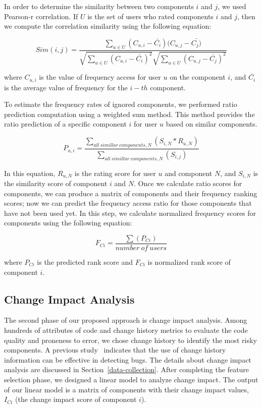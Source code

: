 In order to determine the similarity between two components $i$ and $j$, we used
Pearson-r correlation.
If $U$ is the set of users who rated components $i$ and $j$, then we compute
the correlation similarity using the following equation:

\[
{Sim (i,j) = \frac {\sum_{u\in {U}}(C_{u,i} - \bar{C_i})(C_{u,j} - \bar{C_j)}}
	{ \sqrt{\sum_{u\in {U}}({C_{u,i} - \bar{C_i}})^{2}}
		{ \sqrt{\sum_{u\in {U}}({C_{u,j} - \bar{C_j}})^{2}}}}}	
\]

where $C_{u,i}$ is the value of frequency access for user $u$ on the component $i$, and
$\bar{C_i}$ is the average value of frequency for the $i-th$ component. 

To estimate the frequency rates of ignored components, we performed
ratio prediction computation using a weighted sum method.
This method provides the ratio prediction of a specific component $i$
for user $u$ based on similar components. 

\[
{P_{u,i} = \frac {\sum_{{all\: simillar\: components , N}}(S_{i,N} * R_{u,N})}
	{\sum_{{all\: simillar\: components, N}}({S_{i,j}})}}
\]

In this equation, $R_{u,N}$ is the rating score for user $u$ and component $N$, 
and $S_{i,N}$ is the similarity score of component $i$ and $N$.
Once we calculate ratio scores for components, we can produce a matrix of components
and their frequency ranking scores;  
now we can predict the frequency access ratio for 
those components that have not been used yet.
In this step, we calculate normalized frequency scores
for components using the following equation:

\[
{F_{Ci} = \frac {{\sum}(P_{Ci})}
	{{number\: of\: users}}}
\]

where $P_{Ci}$ is the predicted rank score and $F_{Ci}$ is 
normalized rank score of component $i$. 

\vspace*{3pt}
\subsection{Change Impact Analysis}
\label{CIA-approach}

The second phase of our proposed approach is change impact analysis.
Among hundreds of attributes of code and change history metrics to evaluate
the code quality and proneness to error, we chose change history to identify
the most risky components. A previous study~\cite{raimund} indicates that
the use of change history information can be effective in detecting bugs.
The details about change impact analysis are discussed in Section~\ref{data-collection}.
After completing the feature selection phase, we designed a linear model to analyze
change impact. The output of our linear model is a matrix of components with
their change impact values, $I_{Ci}$ (the change impact score of component $i$).


